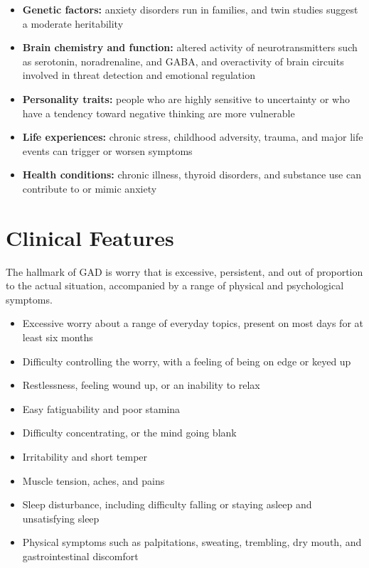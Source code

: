 \begin{itemize}
    \item \textbf{Genetic factors:} anxiety disorders run in families, and twin studies suggest a moderate heritability
    \item \textbf{Brain chemistry and function:} altered activity of neurotransmitters such as serotonin, noradrenaline, and GABA, and overactivity of brain circuits involved in threat detection and emotional regulation
    \item \textbf{Personality traits:} people who are highly sensitive to uncertainty or who have a tendency toward negative thinking are more vulnerable
    \item \textbf{Life experiences:} chronic stress, childhood adversity, trauma, and major life events can trigger or worsen symptoms
    \item \textbf{Health conditions:} chronic illness, thyroid disorders, and substance use can contribute to or mimic anxiety
\end{itemize}

\section*{Clinical Features}
The hallmark of GAD is worry that is excessive, persistent, and out of proportion to the actual situation, accompanied by a range of physical and psychological symptoms.

\begin{itemize}
    \item Excessive worry about a range of everyday topics, present on most days for at least six months
    \item Difficulty controlling the worry, with a feeling of being on edge or keyed up
    \item Restlessness, feeling wound up, or an inability to relax
    \item Easy fatiguability and poor stamina
    \item Difficulty concentrating, or the mind going blank
    \item Irritability and short temper
    \item Muscle tension, aches, and pains
    \item Sleep disturbance, including difficulty falling or staying asleep and unsatisfying sleep
    \item Physical symptoms such as palpitations, sweating, trembling, dry mouth, and gastrointestinal discomfort
\end{itemize}


